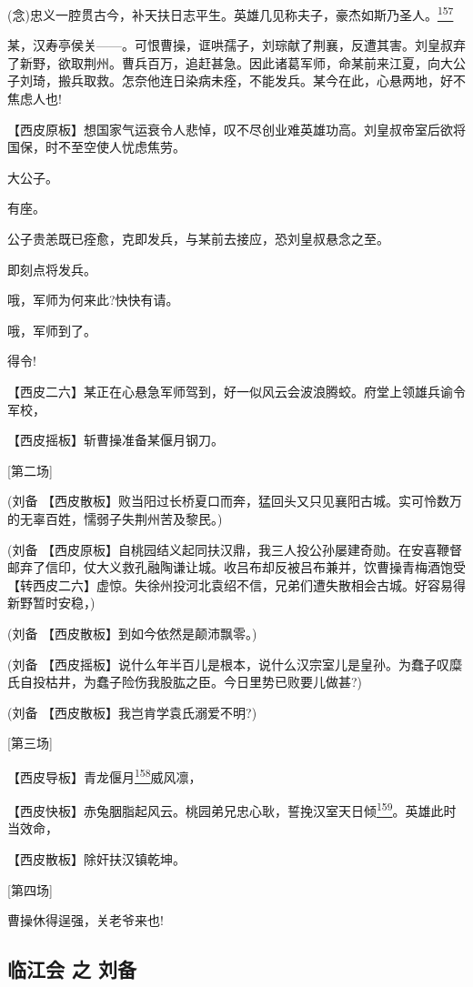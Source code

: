 (念)忠义一腔贯古今，补天扶日志平生。英雄几见称夫子，豪杰如斯乃圣人。\protect\hyperlink{fn157}{\textsuperscript{157}}

某，汉寿亭侯关------。可恨曹操，诓哄孺子，刘琮献了荆襄，反遭其害。刘皇叔弃了新野，欲取荆州。曹兵百万，追赶甚急。因此诸葛军师，命某前来江夏，向大公子刘琦，搬兵取救。怎奈他连日染病未痊，不能发兵。某今在此，心悬两地，好不焦虑人也!

【西皮原板】想国家气运衰令人悲悼，叹不尽创业难英雄功高。刘皇叔帝室后欲将国保，时不至空使人忧虑焦劳。

大公子。

有座。

公子贵恙既已痊愈，克即发兵，与某前去接应，恐刘皇叔悬念之至。

即刻点将发兵。

哦，军师为何来此?快快有请。

哦，军师到了。

得令!

【西皮二六】某正在心悬急军师驾到，好一似风云会波浪腾蛟。府堂上领雄兵谕令军校，

【西皮摇板】斩曹操准备某偃月钢刀。

{[}第二场{]}

(刘备
【西皮散板】败当阳过长桥夏口而奔，猛回头又只见襄阳古城。实可怜数万的无辜百姓，懦弱子失荆州苦及黎民。)

(刘备
【西皮原板】自桃园结义起同扶汉鼎，我三人投公孙屡建奇勋。在安喜鞭督邮弃了信印，仗大义救孔融陶谦让城。收吕布却反被吕布兼并，饮曹操青梅酒饱受【转西皮二六】虚惊。失徐州投河北袁绍不信，兄弟们遭失散相会古城。好容易得新野暂时安稳，)

(刘备 【西皮散板】到如今依然是颠沛飘零。)

(刘备
【西皮摇板】说什么年半百儿是根本，说什么汉宗室儿是皇孙。为蠢子叹糜氏自投枯井，为蠢子险伤我股肱之臣。今日里势已败要儿做甚?)

(刘备 【西皮散板】我岂肯学袁氏溺爱不明?)

{[}第三场{]}

【西皮导板】青龙偃月\protect\hyperlink{fn158}{\textsuperscript{158}}威风凛，

【西皮快板】赤兔胭脂起风云。桃园弟兄忠心耿，誓挽汉室天日倾\protect\hyperlink{fn159}{\textsuperscript{159}}。英雄此时当效命，

【西皮散板】除奸扶汉镇乾坤。

{[}第四场{]}

曹操休得逞强，关老爷来也!

\hypertarget{ux4e34ux6c5fux4f1a-ux4e4b-ux5218ux5907}{%
\subsection{临江会 之
刘备}\label{ux4e34ux6c5fux4f1a-ux4e4b-ux5218ux5907}}

